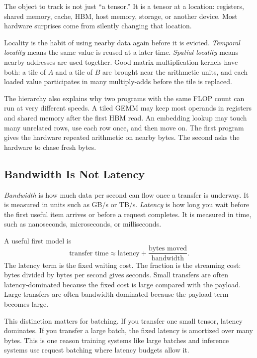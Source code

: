 \begin{aside}
The object to track is not just ``a tensor.'' It is a tensor at a location: registers, shared memory, cache, HBM, host memory, storage, or another device. Most hardware surprises come from silently changing that location.
\end{aside}

Locality is the habit of using nearby data again before it is evicted. \emph{Temporal locality} means the same value is reused at a later time. \emph{Spatial locality} means nearby addresses are used together. Good matrix multiplication kernels have both: a tile of \(A\) and a tile of \(B\) are brought near the arithmetic units, and each loaded value participates in many multiply-adds before the tile is replaced.

The hierarchy also explains why two programs with the same FLOP count can run at very different speeds. A tiled GEMM may keep most operands in registers and shared memory after the first HBM read. An embedding lookup may touch many unrelated rows, use each row once, and then move on. The first program gives the hardware repeated arithmetic on nearby bytes. The second asks the hardware to chase fresh bytes.

\subsection{Bandwidth Is Not Latency}

\emph{Bandwidth} is how much data per second can flow once a transfer is underway. It is measured in units such as GB/s or TB/s. \emph{Latency} is how long you wait before the first useful item arrives or before a request completes. It is measured in time, such as nanoseconds, microseconds, or milliseconds.

A useful first model is
\[
  \text{transfer time}
  \approx
  \text{latency}
  +
  \frac{\text{bytes moved}}{\text{bandwidth}}.
\]
The latency term is the fixed waiting cost. The fraction is the streaming cost: bytes divided by bytes per second gives seconds. Small transfers are often latency-dominated because the fixed cost is large compared with the payload. Large transfers are often bandwidth-dominated because the payload term becomes large.

This distinction matters for batching. If you transfer one small tensor, latency dominates. If you transfer a large batch, the fixed latency is amortized over many bytes. This is one reason training systems like large batches and inference systems use request batching where latency budgets allow it.

